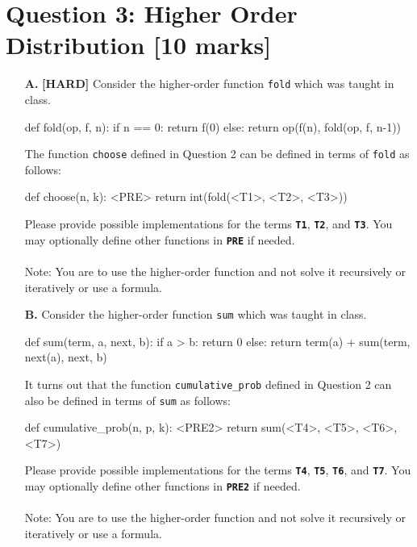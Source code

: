 \section{Question 3: Higher Order Distribution [10 marks]}
\begin{enumerate}
\item[\textbf{A.}]
\textbf{[HARD]} Consider the higher-order function \colorbox{CornflowerBlue!20}{\texttt{fold}} which was taught in class.
\begin{python}
def fold(op, f, n):
    if n == 0:
        return f(0)
    else:
        return op(f(n), fold(op, f, n-1))
\end{python}
The function \colorbox{CornflowerBlue!20}{\texttt{choose}} defined in Question 2 can be defined in terms of \colorbox{CornflowerBlue!20}{\texttt{fold}} 
as follows:
\begin{python}
def choose(n, k):
    <PRE>
    return int(fold(<T1>, <T2>, <T3>))
\end{python}
Please provide possible implementations for the terms \texttt{\bfseries T1}, \texttt{\bfseries T2}, and \texttt{\bfseries T3}. 
You may optionally define other functions in \texttt{\bfseries PRE} if needed. \\ \\
Note: You are to use the higher-order function and not solve it recursively or iteratively or use a formula.
\begin{flushright}
    [6 marks]
\end{flushright}

\item[\textbf{B.}]
Consider the higher-order function \colorbox{CornflowerBlue!20}{\texttt{sum}} which was taught in class.
\begin{python}
def sum(term, a, next, b):
    if a > b:
        return 0
    else:
        return term(a) + sum(term, next(a), next, b)
\end{python}
It turns out that the function \colorbox{CornflowerBlue!20}{\texttt{cumulative\_prob}} defined in Question 2 can also be defined in terms 
of \colorbox{CornflowerBlue!20}{\texttt{sum}} as follows:
\begin{python}
def cumulative_prob(n, p, k):
    <PRE2>
    return sum(<T4>, <T5>, <T6>, <T7>)
\end{python}
Please provide possible implementations for the terms \texttt{\bfseries T4}, \texttt{\bfseries T5}, \texttt{\bfseries T6}, 
and \texttt{\bfseries T7}. You may optionally define other functions in \texttt{\bfseries PRE2} if needed. \\ \\
Note: You are to use the higher-order function and not solve it recursively or iteratively or use a formula.
\begin{flushright}
    [4 marks]
\end{flushright} 
\end{enumerate}

